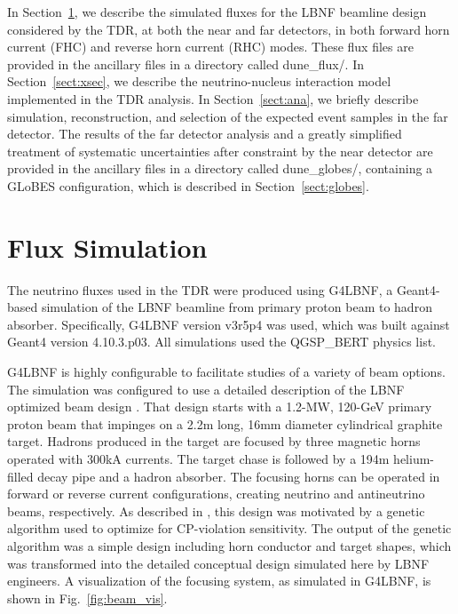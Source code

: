 \documentclass[aps,prd,superscriptaddress]{revtex4-1}
\begin{document}
In Section~\ref{sect:flux}, we describe the simulated fluxes for the LBNF beamline design considered by
the TDR, at both the near and far detectors, in both forward horn current (FHC) and reverse horn current (RHC)
modes. These flux files are provided in the ancillary files in a directory called dune\_flux/.
In Section~\ref{sect:xsec}, we describe the neutrino-nucleus interaction model implemented in the TDR
analysis.
In Section~\ref{sect:ana}, we briefly describe simulation, reconstruction, and selection of the expected event
samples in the far detector.
The results of the far detector analysis and a greatly simplified treatment of systematic uncertainties
after constraint by the near detector are provided in the ancillary files in a directory called
dune\_globes/, containing a GLoBES\cite{globes1,globes2} configuration, which is described in
Section~\ref{sect:globes}.


\section{Flux Simulation}
\label{sect:flux}
The neutrino fluxes used in the TDR were produced using G4LBNF, a Geant4\cite{GEANT4:NIM,GEANT4}-based
simulation of the LBNF beamline from primary proton beam to hadron absorber. Specifically, G4LBNF
version v3r5p4 was used, which was built against Geant4 version 4.10.3.p03.
All simulations used the QGSP\_BERT physics list.

G4LBNF is highly configurable to facilitate studies of a variety of beam options.  
The simulation was configured to use a detailed description of the LBNF optimized beam design \cite{beamcdr}.
That design starts with a 1.2-MW, 120-GeV primary proton beam that impinges on a 2.2m long, 16mm diameter
cylindrical graphite target. Hadrons produced in the target are focused by three magnetic horns operated
with 300kA currents. The target chase is followed by a 194m helium-filled decay pipe and a hadron absorber.
The focusing horns can be operated in forward or reverse current configurations, creating neutrino and
antineutrino beams, respectively. As described in \cite{Abi:2020evt}, this design was motivated by a genetic
algorithm used to optimize for CP-violation sensitivity.
The output of the genetic algorithm was a simple design including horn conductor and target shapes,
which was transformed into the detailed conceptual design simulated here by LBNF engineers.
A visualization of the focusing system, as simulated in G4LBNF, is shown in Fig.~\ref{fig:beam_vis}.
\end{document}
